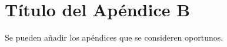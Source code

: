 \chapter{Título del Apéndice B}
\label{Appendix:Key2}

Se pueden añadir los apéndices que se consideren oportunos.